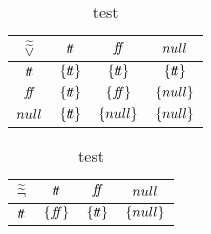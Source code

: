 \begin{table}[H]
    \centering
    \caption{test}
    \begin{tabular}{c|ccc}
        $\widetilde{\widetilde{\lor}}$ & $t\!t$ & $f\!\!f$ & $null$ \\
        \hline
        $t\!t$ & $\{t\!t\}$ & $\{t\!t\}$ & $\{t\!t\}$ \\
        $f\!\!f$ & $\{t\!t\}$ & $\{f\!\!f\}$ & $\{null\}$ \\
        $null$ & $\{t\!t\}$ & $\{null\}$ & $\{null\}$ \\
    \end{tabular}
    \label{tab:aaablor}
\end{table}

\begin{table}[H]
    \centering
    \caption{test}
    \begin{tabular}{c|ccc}
        $\widetilde{\widetilde{\neg}}$ & $t\!t$ & $f\!\!f$ & $null$ \\
        \hline
        $t\!t$ & $\{f\!\!f\}$ & $\{t\!t\}$ & $\{null\}$ \\
    \end{tabular}
    \label{tab:aaabneg}
\end{table}



